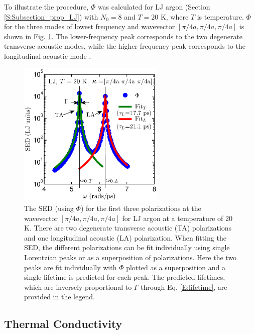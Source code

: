 \documentclass[12pt,twocolumn,iop]{/usr/share/texmf-texlive/tex/latex/iop/iopart}[/usr/share/texmf-texlive/tex/latex/iop/]
\begin{document}
To illustrate the procedure, $\Phi$ was calculated for LJ argon (Section \ref{S:Subsection_prop_LJ}) with $N_0=8$ and $T=20$ K, where $T$ is temperature. $\Phi$ for the three modes of lowest frequency and wavevector $[\pi/4a,\pi/4a,\pi/4a]$ is shown in Fig$.$ \ref{F:LJ_FIT_PEAK}. The lower-frequency peak corresponds to the two degenerate transverse acoustic modes, while the higher frequency peak corresponds to the longitudinal acoustic mode \cite{dove1993}.

\vspace*{0mm}

\begin{figure}
\begin{center}
\includegraphics[angle=0,width=70.0mm]{figure1.eps}
\end{center}
\caption{\label{F:LJ_FIT_PEAK} The SED (using $\Phi$) for the first three polarizations at the wavevector $[\pi/4a,\pi/4a,\pi/4a]$ for LJ argon at a temperature of 20 K. There are two degenerate transverse acoustic (TA) polarizations and one longitudinal acoustic (LA) polarization. When fitting the SED, the different polarizations can be fit individually using single Lorentzian peaks or as a superposition of polarizations. Here the two peaks are fit individually with $\Phi$ plotted as a superposition and a single lifetime is predicted for each peak. The predicted lifetimes, which are inversely proportional to $\Gamma$ through Eq$.$ \eqref{E:lifetime}, are provided in the legend.}
\end{figure}



\subsection{\label{Subsection_Comp_Details_3}Thermal Conductivity}
\end{document}
